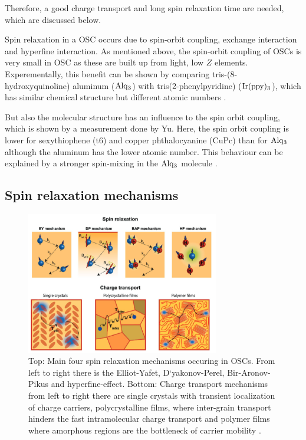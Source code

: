 Therefore, a good charge transport and long spin relaxation time are needed, which are discussed below.

Spin relaxation in a OSC occurs due to spin-orbit coupling, exchange interaction and hyperfine interaction.
As mentioned above, the spin-orbit coupling of OSCs is very small in OSC as these are built up from light, low $Z$ elements.
Experementally, this benefit can be shown by comparing tris-(8-hydroxyquinoline) aluminum ($\ce{Alq_3}$) with tris(2-phenylpyridine) ($\ce{Ir(ppy)_3}$), which has similar chemical structure but different atomic numbers \cite{perovskite}.

But also the molecular structure has an influence to the spin orbit coupling, which is shown by a measurement done by Yu.
Here, the spin orbit coupling is lower for sexythiophene (t6) and copper phthalocyanine (CuPc) than for $\ce{Alq_3}$ although the aluminum has the lower atomic number.
This behaviour can be explained by a stronger spin-mixing in the $\ce{Alq_3}$ molecule \cite{perovskite}.

\subsection{Spin relaxation mechanisms}

\begin{figure}
  \centering
  \includegraphics[width=0.75\textwidth]{graphics/relaxation.png}
  \caption[width=0.85\textwidth]{Top: Main four spin relaxation mechanisms occuring in OSCs. From left to right there is the Elliot-Yafet, D`yakonov-Perel, Bir-Aronov-Pikus and hyperfine-effect. Bottom: Charge transport mechanisms from left to right there are single crystals with transient localization of charge carriers, polycrystalline films, where inter-grain transport hinders the fast intramolecular charge transport and polymer films where amorphous regions are the bottleneck of carrier mobility \cite{perovskite}.}
  \label{fig:relaxation}
\end{figure}


